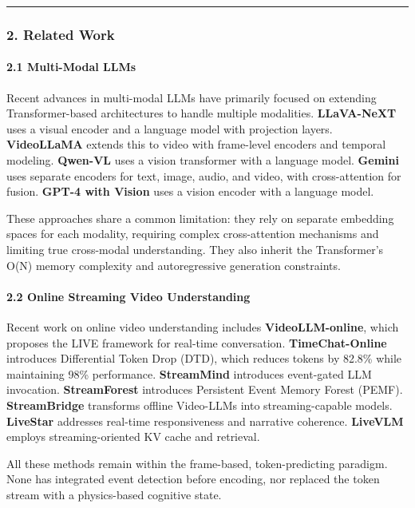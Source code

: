\documentclass[
  11pt,
  a4paper,
]{article}
\begin{document}
\begin{center}\rule{0.5\linewidth}{0.5pt}\end{center}

\subsubsection{2. Related Work}\label{related-work}

\paragraph{2.1 Multi-Modal LLMs}\label{multi-modal-llms}

Recent advances in multi-modal LLMs have primarily focused on extending
Transformer-based architectures to handle multiple modalities.
\textbf{LLaVA-NeXT} uses a visual encoder and a language model with
projection layers. \textbf{VideoLLaMA} extends this to video with
frame-level encoders and temporal modeling. \textbf{Qwen-VL} uses a
vision transformer with a language model. \textbf{Gemini} uses separate
encoders for text, image, audio, and video, with cross-attention for
fusion. \textbf{GPT-4 with Vision} uses a vision encoder with a language
model.

These approaches share a common limitation: they rely on separate
embedding spaces for each modality, requiring complex cross-attention
mechanisms and limiting true cross-modal understanding. They also
inherit the Transformer's O(N) memory complexity and autoregressive
generation constraints.

\paragraph{2.2 Online Streaming Video
Understanding}\label{online-streaming-video-understanding}

Recent work on online video understanding includes
\textbf{VideoLLM-online}, which proposes the LIVE framework for
real-time conversation. \textbf{TimeChat-Online} introduces Differential
Token Drop (DTD), which reduces tokens by 82.8\% while maintaining 98\%
performance. \textbf{StreamMind} introduces event-gated LLM invocation.
\textbf{StreamForest} introduces Persistent Event Memory Forest (PEMF).
\textbf{StreamBridge} transforms offline Video-LLMs into
streaming-capable models. \textbf{LiveStar} addresses real-time
responsiveness and narrative coherence. \textbf{LiveVLM} employs
streaming-oriented KV cache and retrieval.

All these methods remain within the frame-based, token-predicting
paradigm. None has integrated event detection before encoding, nor
replaced the token stream with a physics-based cognitive state.
\end{document}
